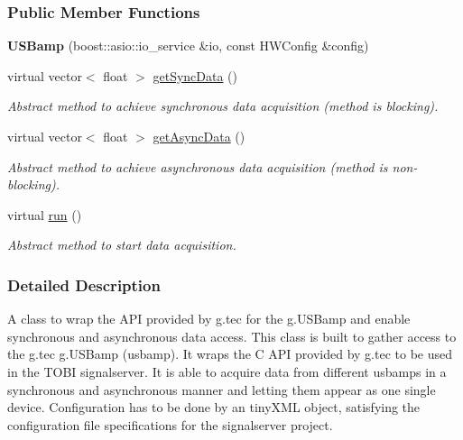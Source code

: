 \subsubsection*{Public Member Functions}
\begin{DoxyCompactItemize}
\item 
\hypertarget{class_u_s_bamp_a976921f7f93a4f9df83a451ba657063b}{
{\bfseries USBamp} (boost::asio::io\_\-service \&io, const HWConfig \&config)}
\label{class_u_s_bamp_a976921f7f93a4f9df83a451ba657063b}

\item 
virtual vector$<$ float $>$ \hyperlink{class_u_s_bamp_ae5aa6002d425924a95d102f1d890c84c}{getSyncData} ()
\begin{DoxyCompactList}\small\item\em Abstract method to achieve synchronous data acquisition (method is blocking). \item\end{DoxyCompactList}\item 
virtual vector$<$ float $>$ \hyperlink{class_u_s_bamp_a645a210ffbc5931560f91c8ee6896300}{getAsyncData} ()
\begin{DoxyCompactList}\small\item\em Abstract method to achieve asynchronous data acquisition (method is non-\/blocking). \item\end{DoxyCompactList}\item 
\hypertarget{class_u_s_bamp_a7ef290d2b3a7dd3a7932beba701257f0}{
virtual \hyperlink{class_u_s_bamp_a7ef290d2b3a7dd3a7932beba701257f0}{run} ()}
\label{class_u_s_bamp_a7ef290d2b3a7dd3a7932beba701257f0}

\begin{DoxyCompactList}\small\item\em Abstract method to start data acquisition. \item\end{DoxyCompactList}\end{DoxyCompactItemize}


\subsubsection{Detailed Description}
A class to wrap the API provided by g.tec for the g.USBamp and enable synchronous and asynchronous data access. This class is built to gather access to the g.tec g.USBamp (usbamp). It wraps the C API provided by g.tec to be used in the TOBI signalserver. It is able to acquire data from different usbamps in a synchronous and asynchronous manner and letting them appear as one single device. Configuration has to be done by an tinyXML object, satisfying the configuration file specifications for the signalserver project. 

